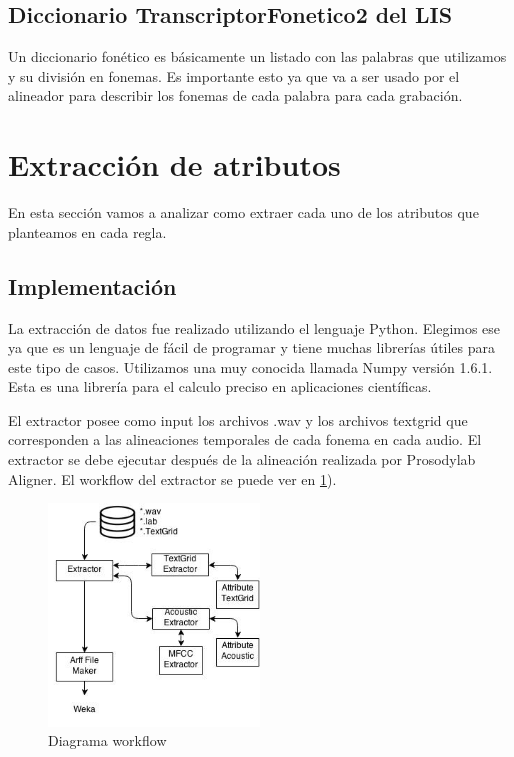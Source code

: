 \documentclass[11pt,a4paper,twoside]{tesis}
\begin{document}
\subsection{Diccionario TranscriptorFonetico2 del LIS}

Un diccionario fonético es básicamente un listado con las palabras que utilizamos y su división en fonemas. Es importante esto ya que va a ser usado por el alineador para describir los fonemas de cada palabra para cada grabación.

\section{Extracción de atributos}

En esta sección vamos a analizar como extraer cada uno de los atributos que planteamos en cada regla.

\subsection{Implementación}

La extracción de datos fue realizado utilizando el lenguaje Python. Elegimos ese ya que es un lenguaje de fácil de programar y tiene muchas librerías útiles para este tipo de casos. Utilizamos una muy conocida llamada Numpy versión 1.6.1. Esta es una librería para el calculo preciso en aplicaciones científicas.

El extractor posee como input los archivos .wav y los archivos textgrid que corresponden a las alineaciones temporales de cada fonema en cada audio. El extractor se debe ejecutar después de la alineación realizada por Prosodylab Aligner. El workflow del extractor se puede ver en \ref{workflow}). 

\begin{figure}[h!]
    \centerline{\includegraphics[width=0.5\textwidth]{diagrama_workflow} }
    \caption{Diagrama workflow}
    \label{workflow}
\end{figure}
\end{document}
